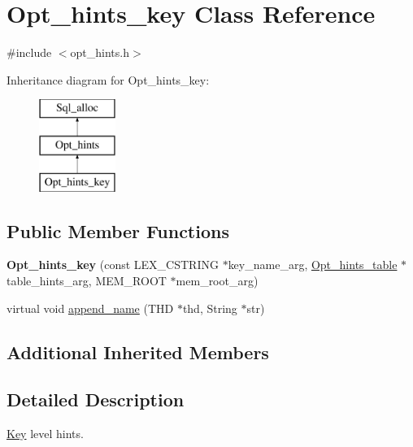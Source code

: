 \hypertarget{classOpt__hints__key}{}\section{Opt\+\_\+hints\+\_\+key Class Reference}
\label{classOpt__hints__key}


{\ttfamily \#include $<$opt\+\_\+hints.\+h$>$}

Inheritance diagram for Opt\+\_\+hints\+\_\+key\+:\begin{figure}[H]
\begin{center}
\leavevmode
\includegraphics[height=3.000000cm]{classOpt__hints__key}
\end{center}
\end{figure}
\subsection*{Public Member Functions}
\begin{DoxyCompactItemize}
\item 
\mbox{\label{classOpt__hints__key_a94b9707bfd5924c217dfd069ce9dd000}} 
{\bfseries Opt\+\_\+hints\+\_\+key} (const L\+E\+X\+\_\+\+C\+S\+T\+R\+I\+NG $\ast$key\+\_\+name\+\_\+arg, \mbox{\hyperlink{classOpt__hints__table}{Opt\+\_\+hints\+\_\+table}} $\ast$table\+\_\+hints\+\_\+arg, M\+E\+M\+\_\+\+R\+O\+OT $\ast$mem\+\_\+root\+\_\+arg)
\item 
virtual void \mbox{\hyperlink{classOpt__hints__key_a2baec152bb32149f180b9ca545194318}{append\+\_\+name}} (T\+HD $\ast$thd, String $\ast$str)
\end{DoxyCompactItemize}
\subsection*{Additional Inherited Members}


\subsection{Detailed Description}
\mbox{\hyperlink{classKey}{Key}} level hints. 

